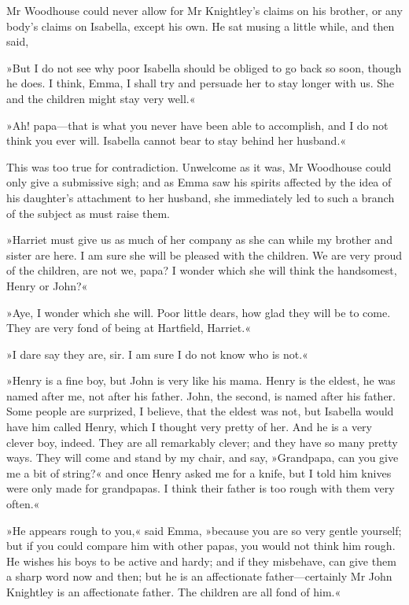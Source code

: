 Mr Woodhouse could never allow for Mr Knightley's claims on his brother, or any body's claims on Isabella, except his own. He sat musing a little while, and then said,

»But I do not see why poor Isabella should be obliged to go back so soon, though he does. I think, Emma, I shall try and persuade her to stay longer with us. She and the children might stay very well.«

»Ah! papa—that is what you never have been able to accomplish, and I do not think you ever will. Isabella cannot bear to stay behind her husband.«

This was too true for contradiction. Unwelcome as it was, Mr Woodhouse could only give a submissive sigh; and as Emma saw his spirits affected by the idea of his daughter's attachment to her husband, she immediately led to such a branch of the subject as must raise them.

»Harriet must give us as much of her company as she can while my brother and sister are here. I am sure she will be pleased with the children. We are very proud of the children, are not we, papa? I wonder which she will think the handsomest, Henry or John?«

»Aye, I wonder which she will. Poor little dears, how glad they will be to come. They are very fond of being at Hartfield, Harriet.«

»I dare say they are, sir. I am sure I do not know who is not.«

»Henry is a fine boy, but John is very like his mama. Henry is the eldest, he was named after me, not after his father. John, the second, is named after his father. Some people are surprized, I believe, that the eldest was not, but Isabella would have him called Henry, which I thought very pretty of her. And he is a very clever boy, indeed. They are all remarkably clever; and they have so many pretty ways. They will come and stand by my chair, and say, »Grandpapa, can you give me a bit of string?« and once Henry asked me for a knife, but I told him knives were only made for grandpapas. I think their father is too rough with them very often.«

»He appears rough to you,« said Emma, »because you are so very gentle yourself; but if you could compare him with other papas, you would not think him rough. He wishes his boys to be active and hardy; and if they misbehave, can give them a sharp word now and then; but he is an affectionate father—certainly Mr John Knightley is an affectionate father. The children are all fond of him.«

